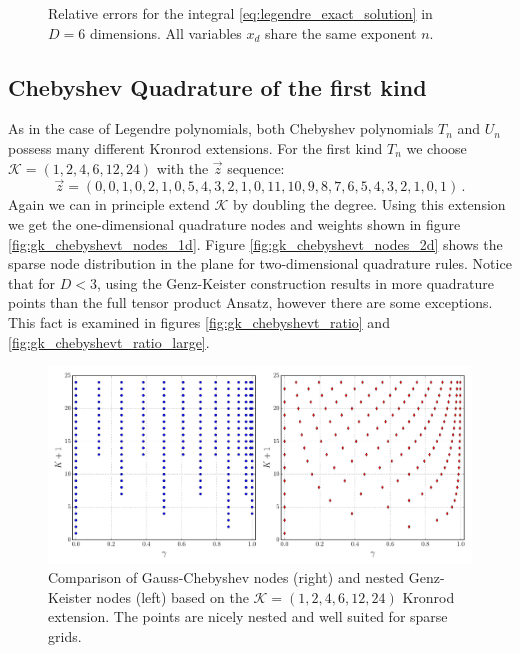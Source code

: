 \documentclass[a4paper,10pt]{article}
\begin{document}
\begin{subfigures}
\begin{figure}
    \caption{Relative errors for the integral \eqref{eq:legendre_exact_solution}
    in $D=6$ dimensions. All variables $x_d$ share the same exponent $n$.}
    \label{fig:monomial_errors_legendre_multivariate_dimension_6}
  \end{figure}
\end{subfigures}

\FloatBarrier
\subsection{Chebyshev Quadrature of the first kind}

As in the case of Legendre polynomials, both Chebyshev polynomials $T_n$
and $U_n$ possess many different Kronrod extensions. For the first kind $T_n$
we choose $\mathcal{K} = (1, 2, 4, 6, 12, 24)$ with the $\vec{z}$ sequence:
\begin{equation*}
  \vec{z} = (0, 0, 1, 0, 2, 1, 0, 5, 4, 3, 2, 1, 0, 11, 10, 9, 8, 7, 6, 5, 4, 3, 2, 1, 0, 1) \,.
\end{equation*}
Again we can in principle extend $\mathcal{K}$ by doubling the degree.
Using this extension we get the one-dimensional quadrature nodes and weights shown
in figure \ref{fig:gk_chebyshevt_nodes_1d}.
Figure \ref{fig:gk_chebyshevt_nodes_2d} shows the sparse
node distribution in the plane for two-dimensional quadrature rules.
Notice that for $D < 3$, using the Genz-Keister construction results
in more quadrature points than the full tensor product Ansatz, however there
are some exceptions. This fact is examined in figures \ref{fig:gk_chebyshevt_ratio}
and \ref{fig:gk_chebyshevt_ratio_large}.

\begin{figure}[h]
  \centering
  \includegraphics[width=\linewidth]{./img/gk_chebyshevt_nodes_cmp.pdf}
  \caption{Comparison of Gauss-Chebyshev nodes (right) and nested Genz-Keister nodes (left)
  based on the $\mathcal{K} = (1, 2, 4, 6, 12, 24)$ Kronrod extension.
  The points are nicely nested and well suited for sparse grids.}
  \label{fig:gk_chebyshevt_nodes_cmp}
\end{figure}
\end{document}
